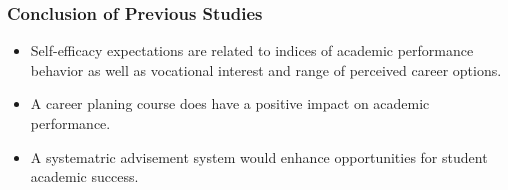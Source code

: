 \begin{frame}
    \frametitle{Conclusion of Previous Studies}
    \Large
    \begin{itemize}[<+->]
        \item Self-efficacy expectations are related to indices of academic performance behavior as well as vocational interest and range of perceived career options.\cite{lent1986self}
        \item A career planing course does have a positive impact on academic performance.\cite{folsom2005impact}
        \item A systematric advisement system would enhance opportunities for student academic success.\cite{jones1983impact}
    \end{itemize}
\end{frame}